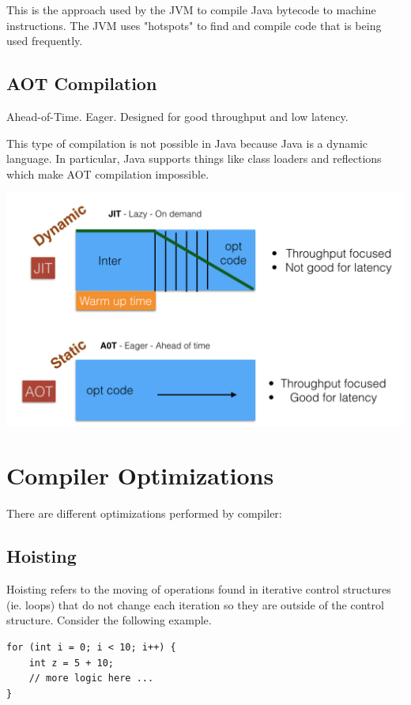\documentclass[twoside]{article}
\begin{document}
This is the approach used by the JVM to compile Java bytecode to machine instructions. The JVM uses "hotspots" to find and compile code that is being used frequently.

\subsection{AOT Compilation}

Ahead-of-Time. Eager. Designed for good throughput and low latency.

This type of compilation is not possible in Java because Java is a dynamic language. In particular, Java supports things like class loaders and reflections which make AOT compilation impossible.

\includegraphics[width=\textwidth]{compilers.png}

\section{Compiler Optimizations}
There are different optimizations performed by compiler:

\subsection{Hoisting}

Hoisting refers to the moving of operations found in iterative control structures (ie. loops) that do not change each iteration so they are outside of the control structure. Consider the following example.

\begin{verbatim}
for (int i = 0; i < 10; i++) {
    int z = 5 + 10;
    // more logic here ...
}
\end{verbatim}
\end{document}
